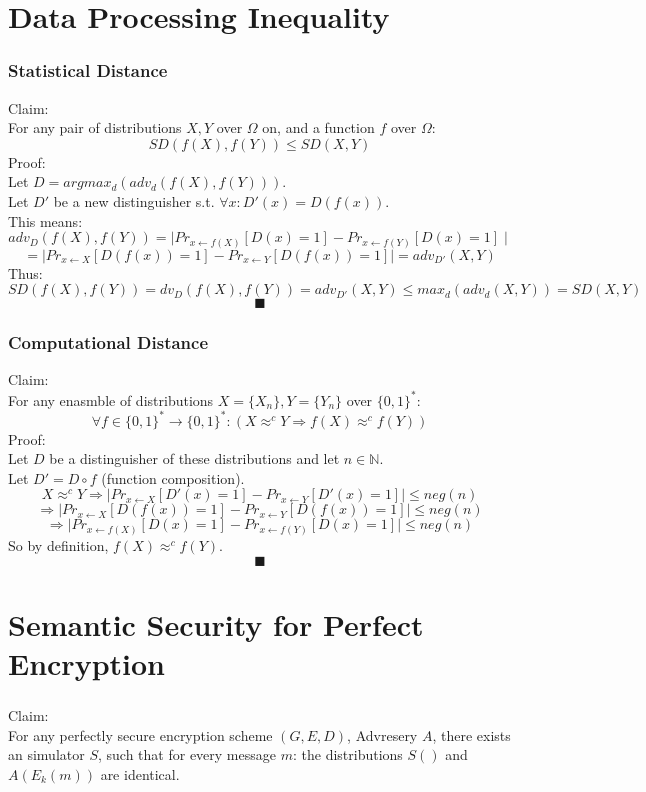 \documentclass{article}
\begin{document}
\part*{Data Processing Inequality}
\setcounter{section}{0}
\section{Statistical Distance}
Claim:\\
For any pair of distributions $X,Y$ over $\Omega$ on, and a function $f$ over $\Omega$:
\[
	SD(f(X),f(Y))\leq SD(X,Y)
\]
Proof:\\
Let $D=argmax_d(adv_d(f(X),f(Y)))$.\\
Let $D'$ be a new distinguisher s.t. $\forall x:D'(x)=D(f(x))$.\\
This means:
\[
	adv_D(f(X),f(Y))=
	\mid Pr_{x\leftarrow f(X)}[D(x)=1] - Pr_{x\leftarrow f(Y)}[D(x)=1]\mid
\]
\[
	=\mid Pr_{x\leftarrow X}[D(f(x))=1] - Pr_{x\leftarrow Y}[D(f(x))=1]\mid=
	adv_{D'}(X,Y)
\]
Thus:
\[
	SD(f(X),f(Y))=dv_D(f(X),f(Y))=adv_{D'}(X,Y)\leq max_d(adv_d(X,Y))=SD(X,Y)
\]
\[\blacksquare\]

\section{Computational Distance}
Claim:\\
For any enasmble of distributions $X=\{X_n\},Y=\{Y_n\}$ over $\{0,1\}^*$:
\[
	\forall f\in\{0,1\}^*\longrightarrow \{0,1\}^*:
	(X\approx^c Y\Rightarrow f(X)\approx^c f(Y))
	\]
Proof:\\
Let $D$ be a distinguisher of these distributions and let $n\in\mathbb{N}$.\\
Let $D'=D\circ f$ (function composition).
\[
	X\approx^c Y
	\Rightarrow \mid Pr_{x\leftarrow X}[D'(x)=1] - Pr_{x\leftarrow Y}[D'(x)=1]\mid \leq neg(n)
\]\[
	\Rightarrow \mid Pr_{x\leftarrow X}[D(f(x))=1] - Pr_{x\leftarrow Y}[D(f(x))=1]\mid \leq neg(n)
\]\[
	\Rightarrow \mid Pr_{x\leftarrow f(X)}[D(x)=1] - Pr_{x\leftarrow f(Y)}[D(x)=1]\mid \leq neg(n)
\]
So by definition, $f(X)\approx^c f(Y)$.
\[\blacksquare\]

\part*{Semantic Security for Perfect Encryption}
\setcounter{section}{0}
\section{}
Claim:\\
For any perfectly secure encryption scheme $(G, E, D)$, Advresery $A$,
there exists an simulator $S$, such that for every message $m$: the distributions $S()$ and $A(E_k(m))$ are identical.\\
\end{document}
